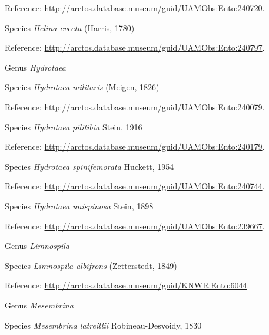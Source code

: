 \documentclass[9pt, article]{memoir}
\begin{document}
\begin{multicols}{2}
Reference: 
\url{http://arctos.database.museum/guid/UAMObs:Ento:240720}.

\vspace{6pt}\noindent\hspace{36pt}Species \textit{Helina evecta} (Harris, 1780)


Reference: 
\url{http://arctos.database.museum/guid/UAMObs:Ento:240797}.

\vspace{6pt}\noindent\hspace{30pt}Genus \textit{Hydrotaea}


\vspace{6pt}\noindent\hspace{36pt}Species \textit{Hydrotaea militaris} (Meigen, 1826)


Reference: 
\url{http://arctos.database.museum/guid/UAMObs:Ento:240079}.

\vspace{6pt}\noindent\hspace{36pt}Species \textit{Hydrotaea pilitibia} Stein, 1916


Reference: 
\url{http://arctos.database.museum/guid/UAMObs:Ento:240179}.

\vspace{6pt}\noindent\hspace{36pt}Species \textit{Hydrotaea spinifemorata} Huckett, 1954


Reference: 
\url{http://arctos.database.museum/guid/UAMObs:Ento:240744}.

\vspace{6pt}\noindent\hspace{36pt}Species \textit{Hydrotaea unispinosa} Stein, 1898


Reference: 
\url{http://arctos.database.museum/guid/UAMObs:Ento:239667}.

\vspace{6pt}\noindent\hspace{30pt}Genus \textit{Limnospila}


\vspace{6pt}\noindent\hspace{36pt}Species \textit{Limnospila albifrons} (Zetterstedt, 1849)


Reference: 
\url{http://arctos.database.museum/guid/KNWR:Ento:6044}.

\vspace{6pt}\noindent\hspace{30pt}Genus \textit{Mesembrina}


\vspace{6pt}\noindent\hspace{36pt}Species \textit{Mesembrina latreillii} Robineau-Desvoidy, 1830



\end{multicols}
\end{document}
